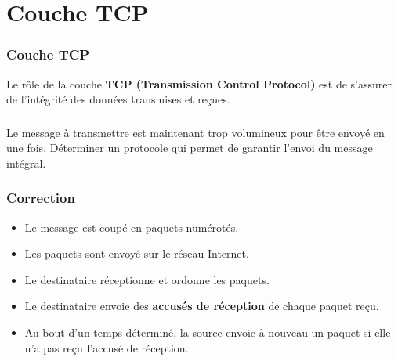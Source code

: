 \documentclass[svgnames,11pt]{beamer}
\begin{document}
\section{Couche TCP}
\begin{frame}
    \frametitle{Couche TCP}

    \begin{aretenir}[]
    Le rôle de la couche \textbf{TCP (Transmission Control Protocol)} est de s'assurer de l'intégrité des données transmises et reçues.
    \end{aretenir}

\end{frame}
\begin{frame}
    \frametitle{}

    \begin{activite}
    Le message à transmettre est maintenant trop volumineux pour être envoyé en une fois. Déterminer un protocole qui permet de garantir l'envoi du message intégral.
    \end{activite}

\end{frame}
\begin{frame}
    \frametitle{Correction}

    \begin{itemize}
        \item<1-> Le message est coupé en paquets numérotés.
        \item<2-> Les paquets sont envoyé sur le réseau Internet.
        \item<3-> Le destinataire réceptionne et ordonne les paquets.
        \item<4-> Le destinataire envoie des \textbf{accusés de réception} de chaque paquet reçu.
        \item<5-> Au bout d'un temps déterminé, la source envoie à nouveau un paquet si elle n'a pas reçu l'accusé de réception.
    \end{itemize}
\end{frame}
\end{document}
